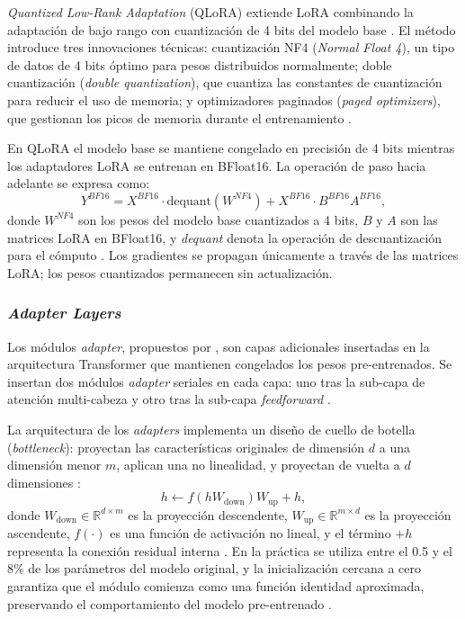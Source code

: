 \textit{Quantized Low-Rank Adaptation} (QLoRA) extiende LoRA combinando la adaptación de bajo rango con cuantización de 4 bits del modelo base \parencite[p.~1]{dettmers2023qlora}. El método introduce tres innovaciones técnicas: cuantización NF4 (\textit{Normal Float 4}), un tipo de datos de 4 bits óptimo para pesos distribuidos normalmente; doble cuantización (\textit{double quantization}), que cuantiza las constantes de cuantización para reducir el uso de memoria; y optimizadores paginados (\textit{paged optimizers}), que gestionan los picos de memoria durante el entrenamiento \parencite[p.~2]{dettmers2023qlora}.

En QLoRA el modelo base se mantiene congelado en precisión de 4 bits mientras los adaptadores LoRA se entrenan en BFloat16. La operación de paso hacia adelante se expresa como:
\begin{equation}
Y^{BF16} = X^{BF16} \cdot \text{dequant}(W^{NF4}) + X^{BF16} \cdot B^{BF16} A^{BF16},
\end{equation}
donde $W^{NF4}$ son los pesos del modelo base cuantizados a 4 bits, $B$ y $A$ son las matrices LoRA en BFloat16, y \textit{dequant} denota la operación de descuantización para el cómputo \parencite[p.~5]{dettmers2023qlora}. Los gradientes se propagan únicamente a través de las matrices LoRA; los pesos cuantizados permanecen sin actualización.

\subsubsection{\textit{Adapter Layers}}

Los módulos \textit{adapter}, propuestos por \textcite{houlsby2019parameterefficienttransferlearningnlp}, son capas adicionales insertadas en la arquitectura Transformer que mantienen congelados los pesos pre-entrenados. Se insertan dos módulos \textit{adapter} seriales en cada capa: uno tras la sub-capa de atención multi-cabeza y otro tras la sub-capa \textit{feedforward} \parencite[p.~3]{houlsby2019parameterefficienttransferlearningnlp}.

La arquitectura de los \textit{adapters} implementa un diseño de cuello de botella (\textit{bottleneck}): proyectan las características originales de dimensión $d$ a una dimensión menor $m$, aplican una no linealidad, y proyectan de vuelta a $d$ dimensiones \parencite[p.~3]{houlsby2019parameterefficienttransferlearningnlp}:
\begin{equation}
h \leftarrow f(hW_{\text{down}})W_{\text{up}} + h,
\end{equation}
donde $W_{\text{down}} \in \mathbb{R}^{d \times m}$ es la proyección descendente, $W_{\text{up}} \in \mathbb{R}^{m \times d}$ es la proyección ascendente, $f(\cdot)$ es una función de activación no lineal, y el término $+h$ representa la conexión residual interna \parencite[p.~3]{houlsby2019parameterefficienttransferlearningnlp}. En la práctica se utiliza entre el 0.5 y el 8\% de los parámetros del modelo original, y la inicialización cercana a cero garantiza que el módulo comienza como una función identidad aproximada, preservando el comportamiento del modelo pre-entrenado \parencite[p.~3]{houlsby2019parameterefficienttransferlearningnlp}.

